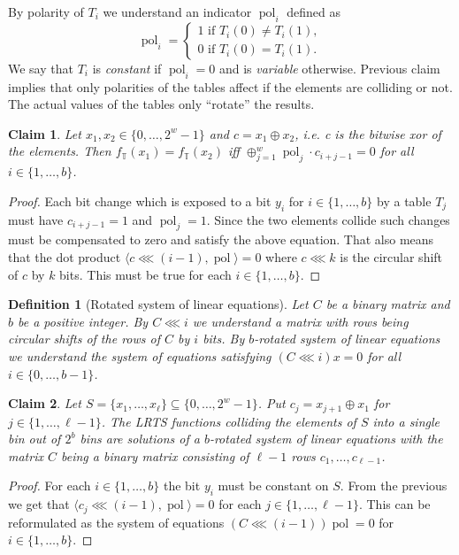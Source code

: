 \documentclass{article}
\newtheorem{claim}{Claim}
\newtheorem{definition}{Definition}
\begin{document}
By polarity of $T_i$ we understand an indicator $\operatorname{pol}_i$ defined as 
\[
\operatorname{pol}_i = 
	\begin{cases}
		1 \mbox{ if } T_i(0) \neq T_i(1), \\
		0 \mbox{ if } T_i(0) = T_i(1).
	\end{cases}
\]
We say that $T_i$ is \emph{constant} if $\operatorname{pol}_i = 0$ and is \emph{variable} otherwise.
Previous claim implies that only polarities of the tables affect if the elements are colliding or not. 
The actual values of the tables only ``rotate'' the results.

\begin{claim}
Let $x_1, x_2 \in \{0, \dots, 2^w - 1\}$ and $c = x_1 \oplus x_2$, i.e. c is the bitwise xor of the elements.
Then $f_\mathbb{T}(x_1) = f_\mathbb{T}(x_2)$ iff $\oplus_{j=1}^{w} \operatorname{pol}_j \cdot c_{i + j - 1} = 0$ for all $i \in \{1, \dots, b\}$.
\end{claim}
\begin{proof}
Each bit change which is exposed to a bit $y_i$ for $i \in \{1, \dots, b\}$ by a table $T_j$ must have $c_{i + j - 1} = 1$ and $\operatorname{pol}_j = 1$. 
Since the two elements collide such changes must be compensated to zero and satisfy the above equation.
That also means that the dot product $\langle c \lll (i - 1), \operatorname{pol} \rangle = 0$ where $c \lll k$ is the circular shift of $c$ by $k$ bits.
This must be true for each $i \in \{1, \dots, b\}$.
\end{proof}

\begin{definition}[Rotated system of linear equations]
Let $C$ be a binary matrix and $b$ be a positive integer.
By $C \lll i$ we understand a matrix with rows being circular shifts of the rows of $C$ by $i$ bits.
By \emph{$b$-rotated system of linear equations} we understand the system of equations satisfying $(C \lll i)x = 0$ for all $i \in \{0, \dots, b - 1\}$.
\end{definition}

\begin{claim}
\label{claim-rotated-system}
Let $S = \{x_1, \dots, x_\ell\} \subseteq \{0, \dots, 2^w - 1\}$.
Put $c_j = x_{j + 1} \oplus x_1$ for $j \in \{1, \dots, \ell - 1\}$.
The LRTS functions colliding the elements of $S$ into a single bin out of $2^b$ bins are solutions of a $b$-rotated system of linear equations with the matrix $C$ being a binary matrix consisting of $\ell - 1$ rows $c_1, \dots, c_{\ell - 1}$.
\end{claim}
\begin{proof}
For each $i \in \{1, \dots, b\}$ the bit $y_i$ must be constant on $S$.
From the previous we get that $\langle c_j \lll (i - 1), \operatorname{pol} \rangle = 0$ for each $j \in \{1, \dots, \ell - 1\}$.
This can be reformulated as the system of equations $(C \lll (i - 1)) \operatorname{pol} = 0$ for $i \in \{1, \dots, b\}$.
\end{proof}
\end{document}
